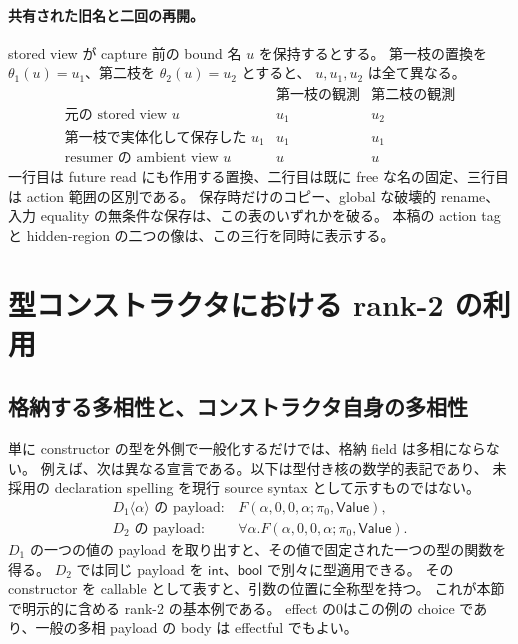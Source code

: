 \documentclass[11pt,a4paper]{article}
\begin{document}
\paragraph{共有された旧名と二回の再開。}
stored view が capture 前の bound 名 \(u\) を保持するとする。
第一枝の置換を \(\theta_1(u)=u_1\)、第二枝を \(\theta_2(u)=u_2\) とすると、
\(u,u_1,u_2\) は全て異なる。
\[
\begin{array}{c|c|c}
 & \text{第一枝の観測}&\text{第二枝の観測}\\\hline
\text{元の stored view }u&u_1&u_2\\
\text{第一枝で実体化して保存した }u_1&u_1&u_1\\
\text{resumer の ambient view }u&u&u
\end{array}
\]
一行目は future read にも作用する置換、二行目は既に free な名の固定、三行目は action 範囲の区別である。
保存時だけのコピー、global な破壊的 rename、入力 equality の無条件な保存は、この表のいずれかを破る。
本稿の action tag と hidden-region の二つの像は、この三行を同時に表示する。

\section{型コンストラクタにおける rank-2 の利用}
\label{sec:rank2}

\subsection{格納する多相性と、コンストラクタ自身の多相性}

単に constructor の型を外側で一般化するだけでは、格納 field は多相にならない。
例えば、次は異なる宣言である。以下は型付き核の数学的表記であり、
未採用の declaration spelling を現行 source syntax として示すものではない。
\[
\begin{array}{ll}
 D_1\langle\alpha\rangle\text{ の payload}:&F(\alpha,0,0,\alpha;\pi_0,\mathsf{Value}),\\
 D_2\text{ の payload}:&\forall\alpha.
       F(\alpha,0,0,\alpha;\pi_0,\mathsf{Value}).
\end{array}
\]
\(D_1\) の一つの値の payload を取り出すと、その値で固定された一つの型の関数を得る。
\(D_2\) では同じ payload を \(\mathsf{int}\)、\(\mathsf{bool}\) で別々に型適用できる。
その constructor を callable として表すと、引数の位置に全称型を持つ。
これが本節で明示的に含める rank-2 の基本例である。
effect の0はこの例の choice であり、一般の多相 payload の body は effectful でもよい。
\end{document}
